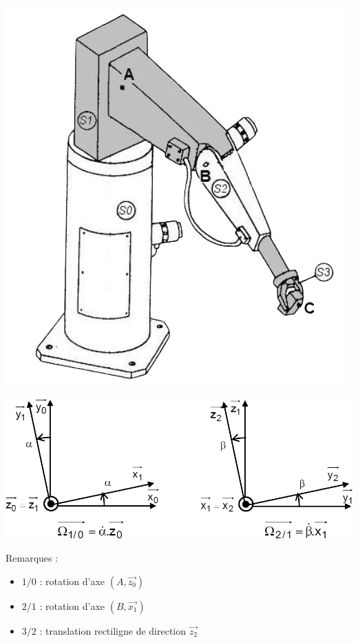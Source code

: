 \vspace{1cm}
\begin{minipage}[c]{.45\linewidth}
	\begin{center}
    \includegraphics[scale=0.4]{png/1_exo2.png}
	\end{center}
\end{minipage}\hfill
\begin{minipage}[c]{.45\linewidth}
	\begin{center}
	\includegraphics[scale=0.25]{png/parametrage.png}
	\end{center}
\end{minipage}
\vspace{1cm}

Remarques :
\begin{itemize}
\item $1/0$ : rotation d’axe $(A,\overrightarrow{z_0})$
\item $2/1$ : rotation d’axe $(B, \overrightarrow{x_1})$
\item $3/2$ : translation rectiligne de direction $\overrightarrow{z_2}$
\end{itemize}

